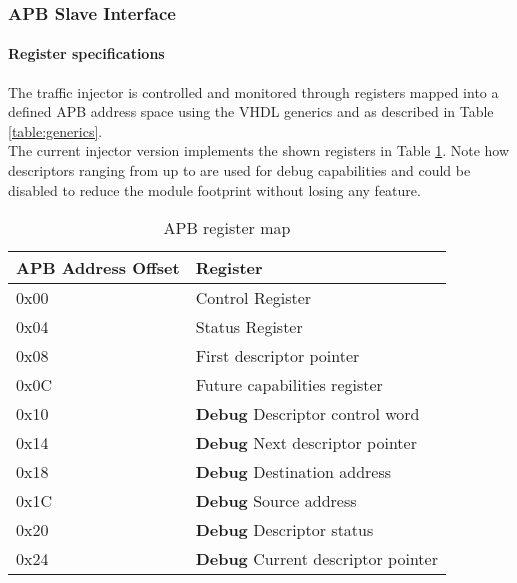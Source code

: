 \subsubsection{APB Slave Interface}\label{section:apb}

\paragraph{Register specifications}
The traffic injector is controlled and monitored through registers mapped into a defined APB address space using the VHDL generics  and  as described in Table \ref{table:generics}.\\
The current injector version implements the shown registers in Table \ref{table:apb_registers}. Note how descriptors ranging from  up to  are used for debug capabilities and could be disabled to reduce the module footprint without losing any feature.

\begin{table}[ht]
	\scriptsize
	\centering
	\begin{tabular}{ll}
		\hline
		APB Address Offset & Register
		\\
		\hline
		0x00 & Control Register
		\\
		0x04 & Status Register
		\\
		0x08 & First descriptor pointer
		\\
		0x0C & Future capabilities register
		\\
		0x10 & \textbf{Debug} Descriptor control word
		\\
		0x14 & \textbf{Debug} Next descriptor pointer
		\\
		0x18 & \textbf{Debug} Destination address
		\\
		0x1C & \textbf{Debug} Source address
		\\
		0x20 & \textbf{Debug} Descriptor status
		\\
		0x24 & \textbf{Debug} Current descriptor pointer
		\\
		\hline
	\end{tabular}
	\caption{APB register map}
	\label{table:apb_registers}
\end{table}

\newpage
